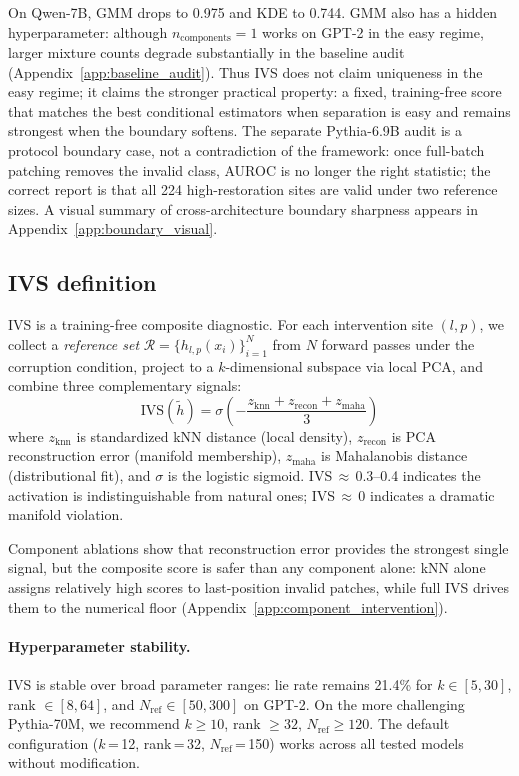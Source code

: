 \documentclass{article}
\begin{document}
On Qwen-7B, GMM drops to 0.975 and KDE to 0.744. GMM also has a hidden hyperparameter: although $n_\text{components}=1$ works on GPT-2 in the easy regime, larger mixture counts degrade substantially in the baseline audit (Appendix~\ref{app:baseline_audit}). Thus IVS does not claim uniqueness in the easy regime; it claims the stronger practical property: a fixed, training-free score that matches the best conditional estimators when separation is easy and remains strongest when the boundary softens. The separate Pythia-6.9B audit is a protocol boundary case, not a contradiction of the framework: once full-batch patching removes the invalid class, AUROC is no longer the right statistic; the correct report is that all 224 high-restoration sites are valid under two reference sizes. A visual summary of cross-architecture boundary sharpness appears in Appendix~\ref{app:boundary_visual}.

\subsection{IVS definition}

IVS is a training-free composite diagnostic. For each intervention site $(l, p)$, we collect a \emph{reference set} $\mathcal{R} = \{h_{l,p}(x_i)\}_{i=1}^{N}$ from $N$ forward passes under the corruption condition, project to a $k$-dimensional subspace via local PCA, and combine three complementary signals:
\begin{equation}
\text{IVS}(\tilde{h}) = \sigma\!\left(-\frac{z_\text{knn} + z_\text{recon} + z_\text{maha}}{3}\right)
\label{eq:ivs}
\end{equation}
where $z_\text{knn}$ is standardized kNN distance (local density), $z_\text{recon}$ is PCA reconstruction error (manifold membership), $z_\text{maha}$ is Mahalanobis distance (distributional fit), and $\sigma$ is the logistic sigmoid. IVS\,$\approx$\,0.3--0.4 indicates the activation is indistinguishable from natural ones; IVS\,$\approx$\,0 indicates a dramatic manifold violation.

Component ablations show that reconstruction error provides the strongest single signal, but the composite score is safer than any component alone: kNN alone assigns relatively high scores to last-position invalid patches, while full IVS drives them to the numerical floor (Appendix~\ref{app:component_intervention}).

\paragraph{Hyperparameter stability.}
IVS is stable over broad parameter ranges: lie rate remains 21.4\% for $k \in [5, 30]$, rank $\in [8, 64]$, and $N_\text{ref} \in [50, 300]$ on GPT-2. On the more challenging Pythia-70M, we recommend $k \geq 10$, rank $\geq 32$, $N_\text{ref} \geq 120$. The default configuration ($k$\,=\,12, rank\,=\,32, $N_\text{ref}$\,=\,150) works across all tested models without modification.
\end{document}
